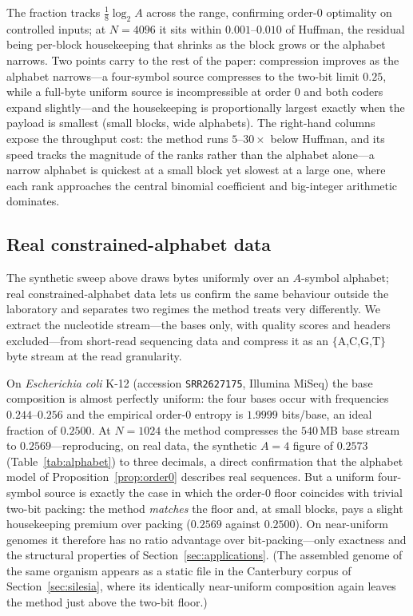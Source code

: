 \documentclass[entropy,article,submit,oneauthor,pdftex]{Definitions/mdpi}
\begin{document}
The fraction tracks $\tfrac18\log_2 A$ across the range, confirming order-$0$ optimality
on controlled inputs; at $N{=}4096$ it sits within $0.001$--$0.010$ of Huffman, the residual
being per-block housekeeping that shrinks as the block grows or the alphabet narrows. Two
points carry to the rest of the paper: compression improves as the alphabet narrows---a
four-symbol source compresses to the two-bit limit $0.25$, while a full-byte uniform source
is incompressible at order $0$ and both coders expand slightly---and the housekeeping is
proportionally largest exactly when the payload is smallest (small blocks, wide alphabets).
The right-hand columns expose the throughput cost: the method runs $5$--$30\times$ below
Huffman, and its speed tracks the magnitude of the ranks rather than the alphabet
alone---a narrow alphabet is quickest at a small block yet slowest at a large one, where
each rank approaches the central binomial coefficient and big-integer arithmetic dominates.

\subsection{Real constrained-alphabet data}\label{sec:genomics}
The synthetic sweep above draws bytes uniformly over an $A$-symbol alphabet; real
constrained-alphabet data lets us confirm the same behaviour outside the
laboratory and separates two regimes the method treats very differently. We
extract the nucleotide stream---the bases only, with quality scores and headers
excluded---from short-read sequencing data and compress it as an
$\{$A,C,G,T$\}$ byte stream at the read granularity.

On \emph{Escherichia coli} K-12 (accession \texttt{SRR2627175}, Illumina MiSeq)
the base composition is almost perfectly uniform: the four bases occur with
frequencies $0.244$--$0.256$ and the empirical order-$0$ entropy is $1.9999$
bits/base, an ideal fraction of $0.2500$. At $N{=}1024$ the method compresses the
$540$\,MB base stream to $0.2569$---reproducing, on real data, the synthetic
$A{=}4$ figure of $0.2573$ (Table~\ref{tab:alphabet}) to three decimals, a
direct confirmation that the alphabet model of Proposition~\ref{prop:order0}
describes real sequences. But a uniform four-symbol source is exactly the case in
which the order-$0$ floor coincides with trivial two-bit packing: the method
\emph{matches} the floor and, at small blocks, pays a slight housekeeping premium
over packing ($0.2569$ against $0.2500$). On near-uniform genomes it therefore has
no ratio advantage over bit-packing---only exactness and the structural properties
of Section~\ref{sec:applications}. (The assembled genome of the same organism
appears as a static file in the Canterbury corpus of Section~\ref{sec:silesia},
where its identically near-uniform composition again leaves the method just above
the two-bit floor.)
\end{document}
